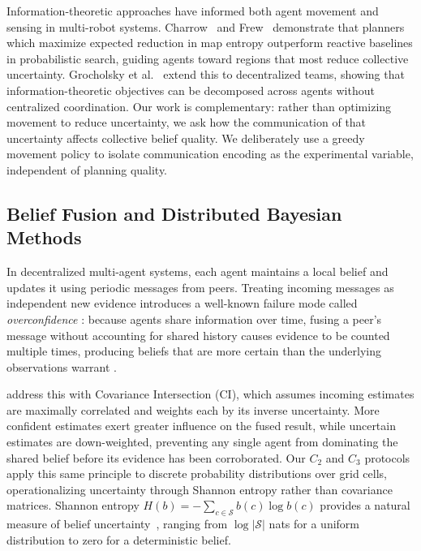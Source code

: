\documentclass[pdflatex,sn-mathphys-num]{sn-jnl}%
\theoremstyle{thmstyleone}%
\theoremstyle{thmstyletwo}%
\theoremstyle{thmstylethree}%
\begin{document}
Information-theoretic approaches have informed both agent movement and sensing in multi-robot systems. Charrow~\cite{charrow2015information} and Frew~\cite{frew2009information} demonstrate that planners which maximize expected reduction in map entropy outperform reactive baselines in probabilistic 
search, guiding agents toward regions that most reduce collective uncertainty. Grocholsky et al.~\cite{grocholsky2006cooperative} extend this to decentralized teams, showing that information-theoretic objectives can be decomposed across agents without centralized coordination. 
Our work is complementary: rather than optimizing movement to reduce uncertainty, we ask how the communication of that uncertainty affects collective belief quality. We deliberately use a greedy movement policy to isolate communication encoding as the experimental 
variable, independent of planning quality.

\subsection{Belief Fusion and Distributed Bayesian Methods}

In decentralized multi-agent systems, each agent maintains a local 
belief and updates it using periodic messages from peers. Treating 
incoming messages as independent new evidence introduces a well-known 
failure mode called \textit{overconfidence} \cite{julier1997new}: 
because agents share information over time, fusing a peer's message 
without accounting for shared history causes evidence to be counted 
multiple times, producing beliefs that are more certain than the 
underlying observations warrant \cite{julier1997new, abu2017distributed}.

\citet{julier1997new} address this with Covariance Intersection (CI), 
which assumes incoming estimates are maximally correlated and weights 
each by its inverse uncertainty. More confident estimates exert greater 
influence on the fused result, while uncertain estimates are 
down-weighted, preventing any single agent from dominating the shared 
belief before its evidence has been corroborated. Our $C_2$ and $C_3$ 
protocols apply this same principle to discrete probability distributions over grid cells, operationalizing uncertainty through Shannon entropy 
rather than covariance matrices. Shannon entropy $H(b) = -\sum_{c \in \mathcal{S}} b(c) \log b(c)$ provides a natural measure of belief uncertainty~\cite{shannon1948mathematical}, ranging from $\log |\mathcal{S}|$ nats for a uniform distribution to zero for a deterministic belief.
\end{document}
